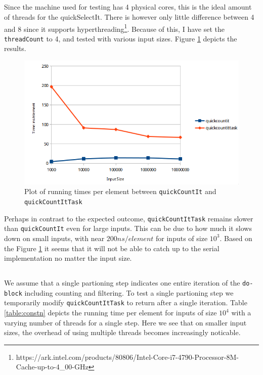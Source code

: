 \documentclass[a5paper]{article}
\begin{document}
\subsection{}
Since the machine used for testing has 4 physical cores, this is the ideal amount of threads for the quickSelectIt. There is however only little difference between 4 and 8 since it supports hyperthreading\footnote{https://ark.intel.com/products/80806/Intel-Core-i7-4790-Processor-8M-Cache-up-to-4\_00-GHz}. Because of this, I have set the \texttt{threadCount} to 4, and tested with various input sizes. Figure \ref{fig:compTask} depicts the results. 
\begin{figure}[!ht]
    \centering
    \noindent\includegraphics[scale=0.5]{res/graph_task.png}
    \caption{Plot of running times per element between \texttt{quickCountIt} and \texttt{quickCountItTask}}
    \label{fig:compTask}
\end{figure}

Perhaps in contrast to the expected outcome, \texttt{quickCountItTask} remains slower than \texttt{quickCountIt} even for large inputs. This can be due to how much it slows down on small inputs, with near $200ns/element$ for inputs of size $10^3$. Based on the Figure \ref{fig:compTask} it seems that it will not be able to catch up to the serial implementation no matter the input size.

\subsection{}
We assume that a single partioning step indicates one entire iteration of the \texttt{do-block} including counting and filtering. To test a single partioning step we temporarily modify \texttt{quickCountItTask} to return after a single iteration. Table \ref{table:constn} depicts the running time per element for inputs of size $10^4$ with a varying number of threads for a single step. Here we see that on smaller input sizes, the overhead of using multiple threads becomes increasingly noticable.
\end{document}
